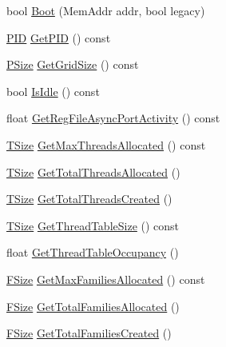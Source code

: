 \begin{DoxyCompactItemize}
\item 
bool \hyperlink{class_simulator_1_1_d_r_i_s_c_a4e8ff4e7860ff0dbea353ee050152536}{Boot} (Mem\+Addr addr, bool legacy)
\item 
\hyperlink{namespace_simulator_aa671021151c047ae2da6dce4e6303476}{P\+I\+D} \hyperlink{class_simulator_1_1_d_r_i_s_c_a48d703f0ed0f4e5f04a2b16cd7f9cedf}{Get\+P\+I\+D} () const 
\item 
\hyperlink{namespace_simulator_a4aa07bee2f34beac11abf48a8ccc47c4}{P\+Size} \hyperlink{class_simulator_1_1_d_r_i_s_c_a47a5161b9bc9897742a288ccfc56168e}{Get\+Grid\+Size} () const 
\item 
bool \hyperlink{class_simulator_1_1_d_r_i_s_c_adf9eb02eaf7fe4b9e361c39858a9c23d}{Is\+Idle} () const 
\item 
float \hyperlink{class_simulator_1_1_d_r_i_s_c_a19576f8e43bcc84c7421c068beac0f25}{Get\+Reg\+File\+Async\+Port\+Activity} () const 
\item 
\hyperlink{namespace_simulator_aefe00209f3ea9f8e24874de522c3c3e7}{T\+Size} \hyperlink{class_simulator_1_1_d_r_i_s_c_ad779958861bf6905d5483b3903661d4b}{Get\+Max\+Threads\+Allocated} () const 
\item 
\hyperlink{namespace_simulator_aefe00209f3ea9f8e24874de522c3c3e7}{T\+Size} \hyperlink{class_simulator_1_1_d_r_i_s_c_acd6f1330acbd7aa05a3865003e205204}{Get\+Total\+Threads\+Allocated} ()
\item 
\hyperlink{namespace_simulator_aefe00209f3ea9f8e24874de522c3c3e7}{T\+Size} \hyperlink{class_simulator_1_1_d_r_i_s_c_a4038eb2a5d9b99e79adfad29779ff5a7}{Get\+Total\+Threads\+Created} ()
\item 
\hyperlink{namespace_simulator_aefe00209f3ea9f8e24874de522c3c3e7}{T\+Size} \hyperlink{class_simulator_1_1_d_r_i_s_c_a780d59e6c1d2f6cfd881339b68d74f39}{Get\+Thread\+Table\+Size} () const 
\item 
float \hyperlink{class_simulator_1_1_d_r_i_s_c_a045a9f8fe69f8d7ca2d849336d4136cd}{Get\+Thread\+Table\+Occupancy} ()
\item 
\hyperlink{namespace_simulator_a06544009313d7c13d411b1c074e5acff}{F\+Size} \hyperlink{class_simulator_1_1_d_r_i_s_c_a1452e5c0c6025e6862ed0e80e6f43680}{Get\+Max\+Families\+Allocated} () const 
\item 
\hyperlink{namespace_simulator_a06544009313d7c13d411b1c074e5acff}{F\+Size} \hyperlink{class_simulator_1_1_d_r_i_s_c_a1e153f19d364676a098cdbeee159335f}{Get\+Total\+Families\+Allocated} ()
\item 
\hyperlink{namespace_simulator_a06544009313d7c13d411b1c074e5acff}{F\+Size} \hyperlink{class_simulator_1_1_d_r_i_s_c_ab091a2aeffb302b8e8934e3d133180d2}{Get\+Total\+Families\+Created} ()

\end{DoxyCompactItemize}
